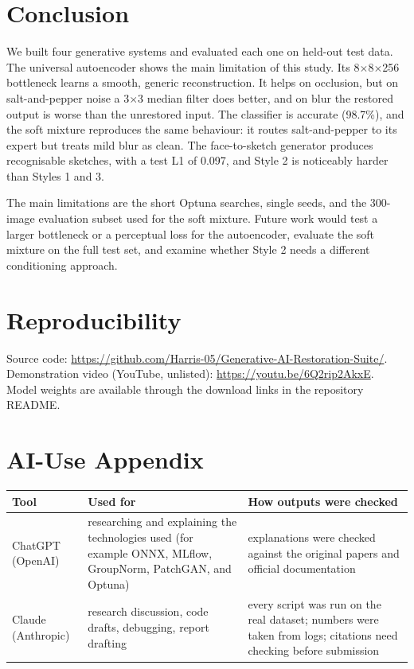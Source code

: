 \documentclass[conference]{IEEEtran}
\begin{document}
\section{Conclusion}
We built four generative systems and evaluated each one on held-out test data. The universal autoencoder
shows the main limitation of this study. Its 8$\times$8$\times$256 bottleneck learns a smooth, generic
reconstruction. It helps on occlusion, but on salt-and-pepper noise a 3$\times$3 median filter does better, and on
blur the restored output is worse than the unrestored input. The classifier is accurate (98.7\%), and
the soft mixture reproduces the same behaviour: it routes salt-and-pepper to its expert but treats mild blur
as clean. The face-to-sketch generator produces recognisable sketches, with a test L1 of 0.097, and
Style 2 is noticeably harder than Styles 1 and 3.

The main limitations are the short Optuna searches, single seeds, and the 300-image evaluation subset used
for the soft mixture. Future work would test a larger bottleneck or a perceptual loss for the autoencoder,
evaluate the soft mixture on the full test set, and examine whether Style 2 needs a different conditioning
approach.

\section*{Reproducibility}
Source code: \url{https://github.com/Harris-05/Generative-AI-Restoration-Suite/}. Demonstration video (YouTube, unlisted):
\url{https://youtu.be/6Q2rip2AkxE}. Model weights are available through the download links in the repository README.

\appendix
\section*{AI-Use Appendix}
\begin{tabular}{@{}p{3.2cm}p{4.6cm}p{4.6cm}@{}}
\toprule
Tool & Used for & How outputs were checked \\
\midrule
ChatGPT (OpenAI) & researching and explaining the technologies used (for example ONNX, MLflow, GroupNorm, PatchGAN, and Optuna) & explanations were checked against the original papers and official documentation \\
Claude (Anthropic) & research discussion, code drafts, debugging, report drafting & every script was run on the
real dataset; numbers were taken from logs; citations need checking before submission \\
\bottomrule
\end{tabular}
\end{document}

